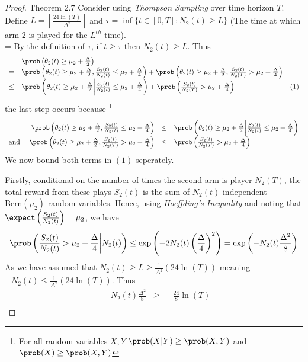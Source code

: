 \documentclass[11pt,a4paper]{article}
\begin{document}
  \begin{proof}{Theorem 2.7}
    Consider using \textit{Thompson Sampling} over time horizon $T$. Define $L=\left\lceil\frac{24\ln(T)}{\Delta^2}\right\rceil$  and ${\tau=\inf\{t\in[0,T]:N_2(t)\geq L\}}$ (The time at which arm 2 is played for the $L^{th}$ time).\\
    \everymath={\displaystyle}
    By the definition of $\tau$, if $t\geq\tau$ then $N_2(t)\geq L$. Thus
    \[\begin{array}{rlll}
    &\prob\left(\theta_2(t)\geq\mu_2+\frac\Delta2\right)\\
    =&\prob\left(\theta_2(t)\geq\mu_2+\frac\Delta2,\frac{S_2(t)}{N_2(t)}\leq\mu_2+\frac\Delta4\right)+\prob\left(\theta_2(t)\geq\mu_2+\frac\Delta2,\frac{S_2(t)}{N_2(T)}>\mu_2+\frac\Delta4\right)\\
    \leq&\prob\left(\theta_2(t)\geq\mu_2+\frac\Delta2\bigg|\frac{S_2(t)}{N_2(t)}\leq\mu_2+\frac\Delta4\right)+\prob\left(\frac{S_2(t)}{N_2(T)}>\mu_2+\frac\Delta4\right)&(1)
    \end{array}\]
    the last step occurs because \footnote{For all random variables $X,Y$ $\prob(X|Y)\geq\prob(X,Y)$ and $\prob(X)\geq\prob(X,Y)$}
    \[\begin{array}{rrcl}
      &\prob\left(\theta_2(t)\geq\mu_2+\frac\Delta2,\frac{S_2(t)}{N_2(t)}\leq\mu_2+\frac\Delta4\right)&\leq&\prob\left(\theta_2(t)\geq\mu_2+\frac\Delta2\bigg|\frac{S_2(t)}{N_2(t)}\leq\mu_2+\frac\Delta4\right)\\
      \text{and }&\prob\left(\theta_2(t)\geq\mu_2+\frac\Delta2,\frac{S_2(t)}{N_2(T)}>\mu_2+\frac\Delta4\right)&\leq&\prob\left(\frac{S_2(t)}{N_2(T)}>\mu_2+\frac\Delta4\right)
    \end{array}\]
    We now bound both terms in $(1)$ seperately.
    \par Firstly, conditional on the number of times the second arm is player $N_2(T)$, the total reward from these plays $S_2(t)$ is the sum of $N_2(t)$ independent $\text{Bern}(\mu_2)$ random variables. Hence, using \textit{Hoeffding's Inequality} and noting that $\textstyle\expect\left(\frac{S_2(t)}{N_2(t)}\right)=\mu_2$, we have
    \[ \prob\left(\frac{S_2(t)}{N_2(t)}>\mu_2+\frac\Delta4\bigg|N_2(t)\right)\leq\exp\left(-2N_2(t)\left(\frac\Delta4\right)^2\right)=\exp\left(-N_2(t)\frac{\Delta^2}8\right) \]
    As we have assumed that $N_2(t)\geq L\geq\frac1{\Delta^2}(24\ln(T))$ meaning $-N_2(t)\leq\frac1{\Delta^2}(24\ln(T))$. Thus
    \[\begin{array}{rrcll}
    &-N_2(t)\frac{\Delta^2}8&\geq&-\frac{24}{8}\ln(T)\\

\end{array}\]
\end{proof}
\end{document}
